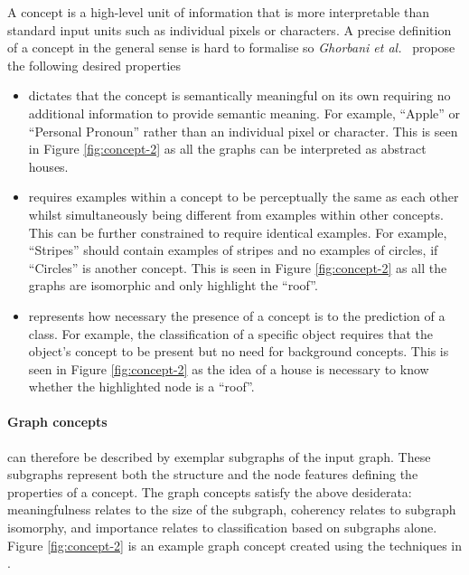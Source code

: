 A concept is a high-level unit of information that is more interpretable than standard input units such as individual pixels or characters.
A precise definition of a concept in the general sense is hard to formalise so \textit{Ghorbani et al.}~\cite{ghorbani2019towards} propose the following desired properties
\begin{itemize}
    \item[]
        dictates that the concept is semantically meaningful on its own requiring no additional information to provide semantic meaning.
        For example, ``Apple'' or ``Personal Pronoun'' rather than an individual pixel or character.
        This is seen in Figure \ref{fig:concept-2} as all the graphs can be interpreted as abstract houses.
    \item[]
        requires examples within a concept to be perceptually the same as each other whilst simultaneously being different from examples within other concepts.
        This can be further constrained to require identical examples.
        For example, ``Stripes'' should contain examples of stripes and no examples of circles, if ``Circles'' is another concept.
        This is seen in Figure \ref{fig:concept-2} as all the graphs are isomorphic and only highlight the ``roof''.
    \item[]
        represents how necessary the presence of a concept is to the prediction of a class.
        For example, the classification of a specific object requires that the object's concept to be present but no need for background concepts.
        This is seen in Figure \ref{fig:concept-2} as the idea of a house is necessary to know whether the highlighted node is a ``roof''.
\end{itemize}



\paragraph{Graph concepts} can therefore be described by exemplar subgraphs of the input graph.
These subgraphs represent both the structure and the node features defining the properties of a concept.
The graph concepts satisfy the above desiderata: meaningfulness relates to the size of the subgraph, coherency relates to subgraph isomorphy, and importance relates to classification based on subgraphs alone.
Figure \ref{fig:concept-2} is an example graph concept created using the techniques in .

